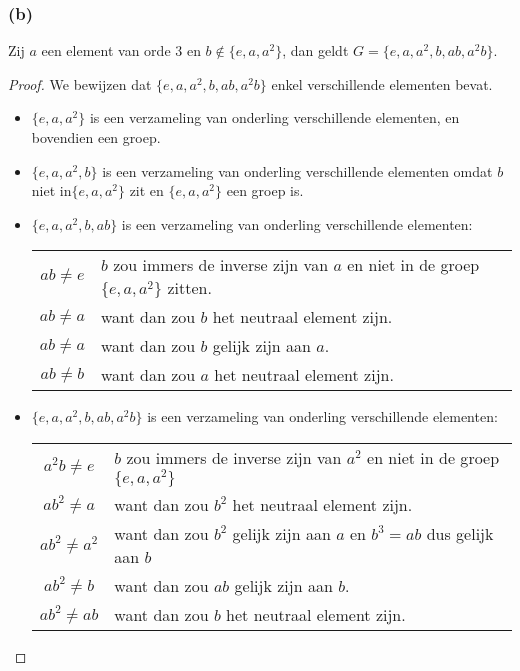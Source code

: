 \documentclass[main.tex]{subfiles}
\begin{document}
\subsubsection*{(b)}
Zij $a$ een element van orde $3$ en $b \not\in \{ e,a,a^{2} \}$, dan geldt $G= \{ e,a,a^{2},b,ab,a^{2}b \}$.

\begin{proof}
  We bewijzen dat $\{ e,a,a^{2},b,ab,a^{2}b \}$ enkel verschillende elementen bevat.
  \begin{itemize}
  \item $\{ e,a,a^{2} \}$ is een verzameling van onderling verschillende elementen, en bovendien een groep.
  \item $\{ e,a,a^{2},b \}$ is een verzameling van onderling verschillende elementen omdat $b$ niet in$\{ e,a,a^{2} \}$ zit en $\{ e,a,a^{2} \}$ een groep is.
  \item $\{ e,a,a^{2},b,ab \}$ is een verzameling van onderling verschillende elementen:\\
    \begin{tabular}[H]{cl}
      \centering
      $ab \neq e$ & $b$ zou immers de inverse zijn van $a$ en niet in de groep $\{ e,a,a^{2} \}$ zitten.\\
      $ab \neq a$ & want dan zou $b$ het neutraal element zijn.\\
      $ab \neq a$ & want dan zou $b$ gelijk zijn aan $a$.\\
      $ab \neq b$ & want dan zou $a$ het neutraal element zijn.\\
    \end{tabular}
  \item $\{ e,a,a^{2},b,ab,a^{2}b \}$ is een verzameling van onderling verschillende elementen:\\
    \begin{tabular}[H]{cl}
      $a^{2}b \neq e$ & $b$ zou immers de inverse zijn van $a^{2}$ en niet in de groep $\{ e,a,a^{2} \}$\\
      $ab^{2} \neq a$ & want dan zou $b^{2}$ het neutraal element zijn.\\
      $ab^{2} \neq a^{2}$ & want dan zou $b^{2}$ gelijk zijn aan $a$ en $b^{3}=ab$ dus gelijk aan $b$\\
      $ab^{2} \neq b$ & want dan zou $ab$ gelijk zijn aan $b$.\\
      $ab^{2} \neq ab$ & want dan zou $b$ het neutraal element zijn.\\
    \end{tabular}
  \end{itemize}
\end{proof}
\end{document}
